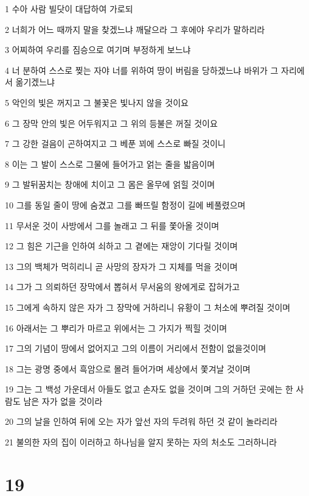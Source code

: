 \par 1 수아 사람 빌닷이 대답하여 가로되
\par 2 너희가 어느 때까지 말을 찾겠느냐 깨달으라 그 후에야 우리가 말하리라
\par 3 어찌하여 우리를 짐승으로 여기며 부정하게 보느냐
\par 4 너 분하여 스스로 찢는 자야 너를 위하여 땅이 버림을 당하겠느냐 바위가 그 자리에서 옮기겠느냐
\par 5 악인의 빛은 꺼지고 그 불꽃은 빛나지 않을 것이요
\par 6 그 장막 안의 빛은 어두워지고 그 위의 등불은 꺼질 것이요
\par 7 그 강한 걸음이 곤하여지고 그 베푼 꾀에 스스로 빠질 것이니
\par 8 이는 그 발이 스스로 그물에 들어가고 얽는 줄을 밟음이며
\par 9 그 발뒤꿈치는 창애에 치이고 그 몸은 올무에 얽힐 것이며
\par 10 그를 동일 줄이 땅에 숨겼고 그를 빠뜨릴 함정이 길에 베풀렸으며
\par 11 무서운 것이 사방에서 그를 놀래고 그 뒤를 쫓아올 것이며
\par 12 그 힘은 기근을 인하여 쇠하고 그 곁에는 재앙이 기다릴 것이며
\par 13 그의 백체가 먹히리니 곧 사망의 장자가 그 지체를 먹을 것이며
\par 14 그가 그 의뢰하던 장막에서 뽑혀서 무서움의 왕에게로 잡혀가고
\par 15 그에게 속하지 않은 자가 그 장막에 거하리니 유황이 그 처소에 뿌려질 것이며
\par 16 아래서는 그 뿌리가 마르고 위에서는 그 가지가 찍힐 것이며
\par 17 그의 기념이 땅에서 없어지고 그의 이름이 거리에서 전함이 없을것이며
\par 18 그는 광명 중에서 흑암으로 몰려 들어가며 세상에서 쫓겨날 것이며
\par 19 그는 그 백성 가운데서 아들도 없고 손자도 없을 것이며 그의 거하던 곳에는 한 사람도 남은 자가 없을 것이라
\par 20 그의 날을 인하여 뒤에 오는 자가 앞선 자의 두려워 하던 것 같이 놀라리라
\par 21 불의한 자의 집이 이러하고 하나님을 알지 못하는 자의 처소도 그러하니라

\chapter{19}

